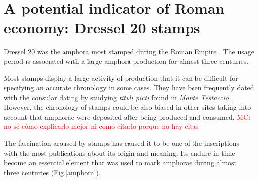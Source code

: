 \documentclass[review]{elsarticle}
\newcommand{\memo}[2]{\textcolor{#1}{#2}}
\newcommand{\maria}[1]{\memo{red}{MC: #1\\}}
\newcommand{\xavi}[1]{\memo{magenta}{XRC: #1\\}}
\begin{document}


 

\section{A potential indicator of Roman economy: Dressel 20 stamps}

Dressel 20 was the amphora most stamped during the Roman Empire \citep[18]{millet_anforas_1998}. The usage period is associated with a large amphora production for almost three centuries. 

Most stamps display a large activity of production that it can be difficult for specifying an accurate chronology in some cases. They have been frequently dated with the consular dating by studying \textit{tituli picti} found in \textit{Monte Testaccio} \citep{Testaccio1, berni_millet_epigrafianforica_2008}.
However, the chronology of stamps could be also biased in other sites taking into account that amphorae were deposited after being produced and consumed.  
\maria{no sé cómo explicarlo mejor ni como citarlo porque no hay citas} 

The fascination aroused by stamps has caused it to be one of the inscriptions with the most publications about its origin and meaning. Its endure in time become an essential element that was used to mark amphorae during almost three centuries \citep{remesal_sellar_2016} (Fig.\ref{amphora}). 
\end{document}

